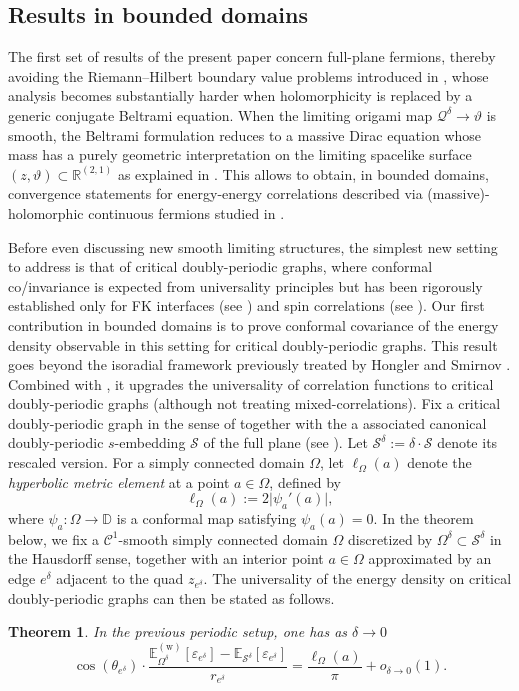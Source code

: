\documentclass[reqno]{amsart}
\numberwithin{equation}{section}
\newtheorem{theo}{Theorem}[section]
\theoremstyle{definition}
\theoremstyle{remark}
\newcommand\cQ{\mathcal{Q}}
\newcommand\cS{\mathcal{S}}
\begin{document}
\subsection{Results in bounded domains}

The first set of results of the present paper concern full-plane fermions, thereby avoiding the Riemann–Hilbert boundary value problems introduced in \cite{Smirnov_Ising}, whose analysis becomes substantially harder when holomorphicity is replaced by a generic conjugate Beltrami equation. When the limiting origami map $\cQ^\delta \to \vartheta$ is smooth, the Beltrami formulation reduces to a massive Dirac equation whose mass has a purely geometric interpretation on the limiting spacelike surface $(z,\vartheta)\subset\mathbb R^{(2,1)}$ as explained in \cite[(2.29)]{Che20}. This allows to obtain, in bounded domains, convergence statements for energy-energy correlations described via (massive)-holomorphic continuous fermions studied in \cite{park2025near}.

Before even discussing new smooth limiting structures, the simplest new setting to address is that of critical doubly-periodic graphs, where conformal co/invariance is expected from universality principles but has been rigorously established only for FK interfaces (see \cite[Theorem~1.2]{Che20}) and spin correlations (see \cite{Mah25b}). Our first contribution in bounded domains is to prove conformal covariance of the energy density observable in this setting for critical doubly-periodic graphs. This result goes beyond the isoradial framework previously treated by Hongler and Smirnov \cite{hon-smi,HonPHD}. Combined with \cite{Mah25b}, it upgrades the universality of correlation functions to critical doubly-periodic graphs (although not treating mixed-correlations). Fix a critical doubly-periodic graph in the sense of \cite{cimasoni-duminil} together with the a associated canonical doubly-periodic $s$-embedding $\cS$ of the full plane (see \cite[Lemma 2.3]{Che20}). Let $\cS^\delta := \delta \cdot \cS$ denote its rescaled version. For a simply connected domain $\Omega$, let $\ell_\Omega(a)$ denote the \emph{hyperbolic metric element} at a point $a \in \Omega$, defined by
\[
\ell_\Omega(a) := 2 \lvert \psi_a'(a) \rvert,
\]
where $\psi_a : \Omega \to \mathbb{D}$ is a conformal map satisfying $\psi_a(a)=0$. In the theorem below, we fix a $\mathcal{C}^1$-smooth simply connected domain $\Omega$ discretized by $\Omega^\delta \subset \cS^\delta$ in the Hausdorff sense, together with an interior point $a \in \Omega$ approximated by an edge $e^\delta$ adjacent to the quad $z_{e^\delta}$. The universality of the energy density on critical doubly-periodic graphs can then be stated as follows.
\begin{theo}\label{thm:converger-energy-doubly-periodic}
In the previous periodic setup, one has as $\delta \to 0 $
\begin{equation}
\cos(\theta_{e^\delta})\cdot \frac{\mathbb{E}^{(\mathrm{w})}_{\Omega^\delta}[\varepsilon_{e^\delta}] - \mathbb{E}_{\cS^\delta}[\varepsilon_{e^\delta}]}{r_{e^\delta}} = \frac{\ell_\Omega(a)}{\pi} + o_{\delta \to 0}(1).
\end{equation}
\end{theo}
\end{document}
